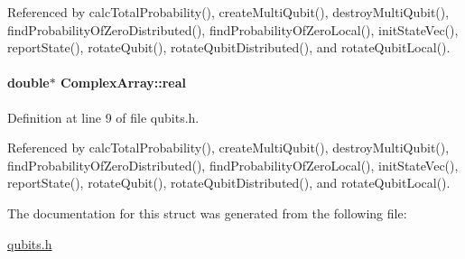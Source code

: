 Referenced by calc\+Total\+Probability(), create\+Multi\+Qubit(), destroy\+Multi\+Qubit(), find\+Probability\+Of\+Zero\+Distributed(), find\+Probability\+Of\+Zero\+Local(), init\+State\+Vec(), report\+State(), rotate\+Qubit(), rotate\+Qubit\+Distributed(), and rotate\+Qubit\+Local().

\paragraph[{\texorpdfstring{real}{real}}]{\setlength{\rightskip}{0pt plus 5cm}double$\ast$ Complex\+Array\+::real}\hypertarget{structComplexArray_a1cf9fd31d6dce5ef618d2bcf3e4f8b69}{}\label{structComplexArray_a1cf9fd31d6dce5ef618d2bcf3e4f8b69}


Definition at line 9 of file qubits.\+h.



Referenced by calc\+Total\+Probability(), create\+Multi\+Qubit(), destroy\+Multi\+Qubit(), find\+Probability\+Of\+Zero\+Distributed(), find\+Probability\+Of\+Zero\+Local(), init\+State\+Vec(), report\+State(), rotate\+Qubit(), rotate\+Qubit\+Distributed(), and rotate\+Qubit\+Local().



The documentation for this struct was generated from the following file\+:\begin{DoxyCompactItemize}
\item 
\hyperlink{qubits_8h}{qubits.\+h}\end{DoxyCompactItemize}
